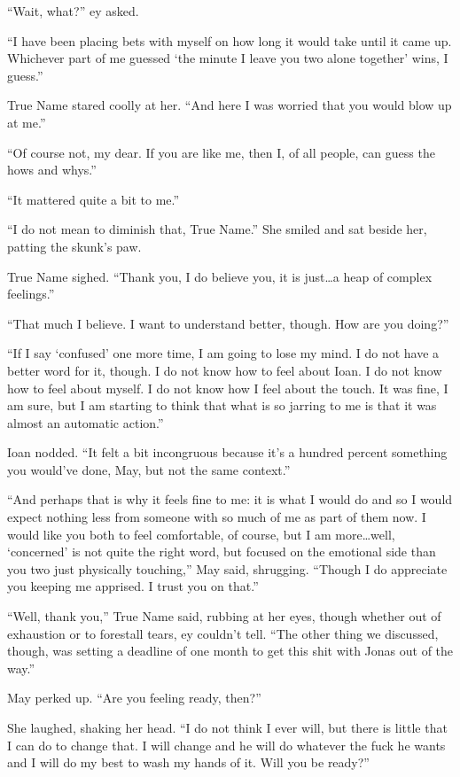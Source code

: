 ``Wait, what?'' ey asked.

``I have been placing bets with myself on how long it would take until it came up. Whichever part of me guessed `the minute I leave you two alone together' wins, I guess.''

True Name stared coolly at her. ``And here I was worried that you would blow up at me.''

``Of course not, my dear. If you are like me, then I, of all people, can guess the hows and whys.''

``It mattered quite a bit to me.''

``I do not mean to diminish that, True Name.'' She smiled and sat beside her, patting the skunk's paw.

True Name sighed. ``Thank you, I do believe you, it is just\ldots a heap of complex feelings.''

``That much I believe. I want to understand better, though. How are you doing?''

``If I say `confused' one more time, I am going to lose my mind. I do not have a better word for it, though. I do not know how to feel about Ioan. I do not know how to feel about myself. I do not know how I feel about the touch. It was fine, I am sure, but I am starting to think that what is so jarring to me is that it was almost an automatic action.''

Ioan nodded. ``It felt a bit incongruous because it's a hundred percent something you would've done, May, but not the same context.''

``And perhaps that is why it feels fine to me: it is what I would do and so I would expect nothing less from someone with so much of me as part of them now. I would like you both to feel comfortable, of course, but I am more\ldots well, `concerned' is not quite the right word, but focused on the emotional side than you two just physically touching,'' May said, shrugging. ``Though I do appreciate you keeping me apprised. I trust you on that.''

``Well, thank you,'' True Name said, rubbing at her eyes, though whether out of exhaustion or to forestall tears, ey couldn't tell. ``The other thing we discussed, though, was setting a deadline of one month to get this shit with Jonas out of the way.''

May perked up. ``Are you feeling ready, then?''

She laughed, shaking her head. ``I do not think I ever will, but there is little that I can do to change that. I will change and he will do whatever the fuck he wants and I will do my best to wash my hands of it. Will you be ready?''

